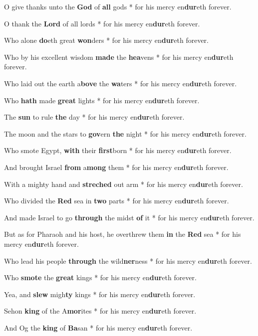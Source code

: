 \begin{multicols}{2}
	O give thanks unto the \textbf{God} of \textbf{all} gods * for his mercy en\textbf{dur}eth forever.
	
	O thank the \textbf{Lord} of all lords * for his mercy en\textbf{dur}eth forever.
	
	Who alone \textbf{do}eth great \textbf{won}ders * for his mercy en\textbf{dur}eth forever.
	
	Who by his excellent wisdom \textbf{made} the \textbf{hea}vens * for his mercy en\textbf{dur}eth forever.
	
	Who laid out the earth a\textbf{bove} the \textbf{wa}ters * for his mercy en\textbf{dur}eth forever.
	
	Who \textbf{hath} made \textbf{great} lights * for his mercy en\textbf{dur}eth forever.
	
	The \textbf{sun} to rule \textbf{the} day * for his mercy en\textbf{dur}eth forever.
	
	The moon and the stars to \textbf{gov}ern \textbf{the} night * for his mercy en\textbf{dur}eth forever.
	
	Who smote Egypt, \textbf{with} their \textbf{first}born * for his mercy en\textbf{dur}eth forever.
	
	And brought Israel \textbf{from} a\textbf{mong} them * for his mercy en\textbf{dur}eth forever.
	
	With a mighty hand and \textbf{streched} out arm * for his mercy en\textbf{dur}eth forever.
	
	Who divided the \textbf{Red} sea in \textbf{two} parts * for his mercy en\textbf{dur}eth forever.
	
	And made Israel to go \textbf{through} the midst \textbf{of} it * for his mercy en\textbf{dur}eth forever.
	
	But as for Pharaoh and his host, he overthrew them \textbf{in} the \textbf{Red} sea * for his mercy en\textbf{dur}eth forever.
	
	Who lead his people \textbf{through} the wild\textbf{ner}ness * for his mercy en\textbf{dur}eth forever.
	
	Who \textbf{smote} the \textbf{great} kings * for his mercy en\textbf{dur}eth forever.
	
	Yea, and \textbf{slew} migh\textbf{ty} kings * for his mercy en\textbf{dur}eth forever.
	
	Sehon \textbf{king} of the A\textbf{mor}ites * for his mercy en\textbf{dur}eth forever.
	
	And Og the \textbf{king} of \textbf{Ba}san * for his mercy en\textbf{dur}eth forever.
	

\end{multicols}
